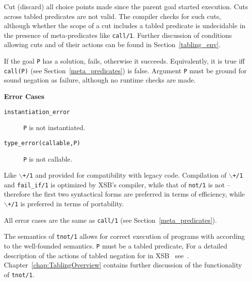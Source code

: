 \begin{description}
   
    Cut (discard) all choice points made since the parent goal
    started execution.
    Cuts across tabled predicates are not valid.  The compiler checks for
    such cuts, although whether the scope of a cut includes a tabled 
    predicate is undecidable in the presence of meta-predicates like
    {\tt call/1}.
    Further discussion of conditions allowing cuts and of their actions 
    can be found in Section~\ref{tabling_env}.

%
If the goal {\tt P} has a solution, fails, otherwise it succeeds.
Equivalently, it is true iff {\tt call(P)} (see
Section~\ref{meta_predicates}) is false. Argument {\tt P} must be
ground for sound negation as failure, although no runtime checks are
made.

{\bf Error Cases}
    \begin{description}
    \item[{\tt instantiation\_error}]
	{\tt P} is not instantiated.
    \item[{\tt type\_error(callable,P)}]
	{\tt P} is not callable.
    \end{description}

%
Like {\tt $\backslash$+/1} and provided for compatibility with legacy
code.  Compilation of {\tt $\backslash$+/1} and {\tt fail\_if/1} is
optimized by XSB's compiler, while that of {\tt not/1} is not --
therefore the first two syntactical forms are preferred in terms of
efficiency, while {\tt $\backslash$+/1} is preferred in terms of
portability.

All error cases are the same as {\tt call/1} (see
Section~\ref{meta_predicates}).

 \label{tnot/1}
    The semantics of {\tt tnot/1} allows for correct execution of
    programs with according to the well-founded semantics.  {\tt P}
    must be a tabled predicate, 
%
% 
%
    For a detailed description of the actions of tabled negation for
    in XSB \version\ see~\cite{SaSw98, SaSW96}.
    Chapter~\ref{chap:TablingOverview} contains further discussion of the
    functionality of {\tt tnot/1}.


\end{description}
